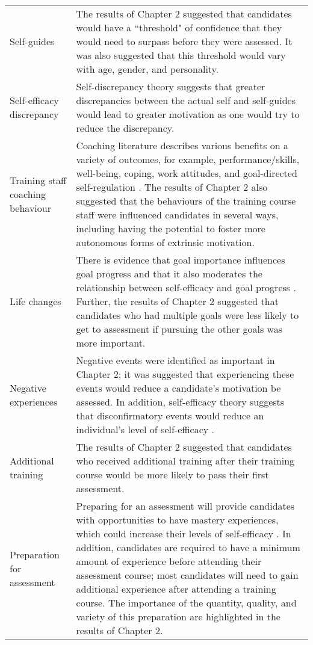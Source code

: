 \documentclass[
  12pt,
  a4paper,
]{book}
\begin{document}
\begin{landscape}
\begin{longtable}[t]{>{\raggedright\arraybackslash}p{3cm}>{\raggedright\arraybackslash}p{21cm}}
\rowcolor{gray!6}  Self-guides & The results of Chapter 2 suggested that candidates would have a ``threshold" of confidence that they would need to surpass before they were assessed. It was also suggested that this threshold would vary with age, gender, and personality.\\
Self-efficacy discrepancy & Self-discrepancy theory \citep[cf.][]{Higgins1987} suggests that greater discrepancies between the actual self and self-guides would lead to greater motivation as one would try to reduce the discrepancy.\\
\rowcolor{gray!6}  Training staff coaching behaviour & Coaching literature describes various benefits on a variety of outcomes, for example, performance/skills, well-being, coping, work attitudes, and goal-directed self-regulation \citep[e.g.,][]{Theeboom2014a, Weinberg2014}. The results of Chapter 2 also suggested that the behaviours of the training course staff were influenced candidates in several ways, including having the potential to foster more autonomous forms of extrinsic motivation.\\
\addlinespace
Life changes & There is evidence that goal importance influences goal progress and that it also moderates the relationship between self-efficacy and goal progress \citep[cf.][]{Beattie2015}. Further, the results of Chapter 2 suggested that candidates who had multiple goals were less likely to get to assessment if pursuing the other goals was more important.\\
\rowcolor{gray!6}  Negative experiences & Negative events were identified as important in Chapter 2; it was suggested that experiencing these events would reduce a candidate's motivation be assessed. In addition, self-efficacy theory suggests that disconfirmatory events would reduce an individual's level of self-efficacy \citep{Bandura1977, Bandura1982}.\\
Additional training & The results of Chapter 2 suggested that candidates who received additional training after their training course would be more likely to pass their first assessment.\\
\rowcolor{gray!6}  Preparation for assessment & Preparing for an assessment will provide candidates with opportunities to have mastery experiences, which could increase their levels of self-efficacy \citep{Bandura1977, Bandura1982}. In addition, candidates are required to have a minimum amount of experience before attending their assessment course; most candidates will need to gain additional experience after attending a training course. The importance of the quantity, quality, and variety of this preparation are highlighted in the results of Chapter 2.\\

\end{longtable}
\end{landscape}
\end{document}
